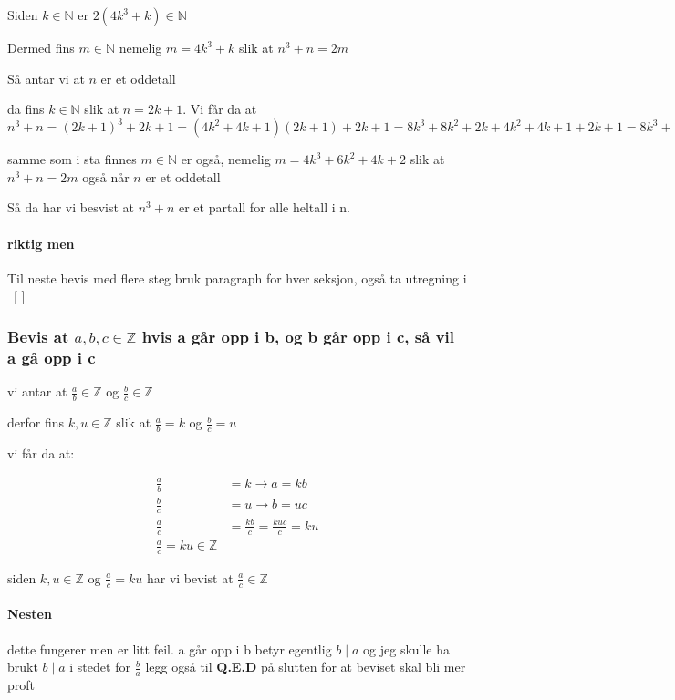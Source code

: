 \documentclass{article}
\begin{document}
Siden $k \in \mathbb{N}$ er $2(4k^3+k) \in \mathbb{N}$

Dermed fins $m \in \mathbb{N}$ nemelig $m=4k^3+k$ slik at $n^3+n=2m$

Så antar vi at $n$ er et oddetall

da fins $k \in \mathbb{N}$ slik at $n=2k+1$. Vi får da at $n^3+n=(2k+1)^3+2k+1=(4k^2+4k+1)(2k+1)+2k+1=8k^3+8k^2+2k+4k^2+4k+1+2k+1=8k^3+12k^2+8k+2=2(4k^3+6k^2+4k+1)$

samme som i sta finnes $m \in \mathbb{N}$ er også, nemelig $m=4k^3+6k^2+4k+2$ slik at $n^3+n=2m$ også når $n$ er et oddetall

Så da har vi besvist at $n^3+n$ er et partall for alle heltall i n.

\paragraph{riktig men}

Til neste bevis med flere steg bruk paragraph for hver seksjon, også ta utregning i \ [ ] \

\subsubsection{Bevis at $a,b,c \in \mathbb{Z}$ hvis a går opp i b, og b går opp i c, så vil a gå opp i c }

vi antar at $\frac{a}{b} \in \mathbb{Z}$ og $\frac{b}{c} \in \mathbb{Z}$

derfor fins $k, u \in \mathbb{Z}$ slik at $\frac{a}{b}=k$ og $\frac{b}{c}=u$

vi får da at:

\begin{align*}
    \frac{a}{b} &= k \rightarrow a = kb \\
    \frac{b}{c} &= u \rightarrow b = uc \\
    \frac{a}{c} &= \frac{kb}{c} = \frac{kuc}{c}=ku \\
    \frac{a}{c}=ku \in \mathbb{Z}
\end{align*}

siden $k,u \in \mathbb{Z}$ og $\frac{a}{c}=ku$ har vi bevist at $\frac{a}{c} \in \mathbb{Z}$

\paragraph{Nesten}

dette fungerer men er litt feil. a går opp i b betyr egentlig $b \mid a$
og jeg skulle ha brukt $b \mid a$ i stedet for $\frac{b}{a}$
legg også til \textbf{Q.E.D} på slutten for at beviset skal bli mer proft
\end{document}
